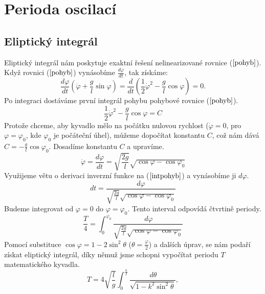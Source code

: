 \section{Perioda oscilací}
\label{sec:Perioda oscilací}

\subsection{Eliptický integrál}
\label{sec:Eliptický integrál}
Eliptický integrál nám poskytuje exaktní řešení nelinearizované rovnice ($\ref{pohyb}$). Když rovnici ($\ref{pohyb}$) vynásobíme $\frac{d\varphi}{dt}$, tak získáme:
\begin{equation*}
\frac{d\varphi}{dt}\left(\ddot{\varphi}+\frac{g}{l}\sin\varphi\right)=\frac{d}{dt}\left(\frac{1}{2}\dot{\varphi}^2-\frac{g}{l}\cos\varphi\right)=0.
\end{equation*}
Po integraci dostáváme první integrál pohybu pohybové rovnice ($\ref{pohyb}$).
\begin{equation}
\frac{1}{2}\dot{\varphi}^2-\frac{g}{l}\cos\varphi=C
\end{equation}
Protože chceme, aby kyvadlo mělo na počátku nulovou rychlost ($\dot{\varphi}=0$, pro $\varphi=\varphi_0$, kde $\varphi_0$ je počáteční úhel), můžeme dopočítat konstantu $C$, což nám dává $C=-\frac{g}{l}\cos\varphi_0$. Dosadíme konstantu $C$ a upravíme.
\begin{equation}
\label{intpohyb}
\dot{\varphi}=\frac{d\varphi}{dt}=\sqrt{\frac{2g}{l}}\sqrt{\cos\varphi-\cos\varphi_0}
\end{equation}
Využijeme větu o derivaci inverzní funkce na ($\ref{intpohyb}$) a vynásobíme ji $d\varphi$.
\begin{equation}
dt=\frac{d\varphi}{\sqrt{\frac{2g}{l}}\sqrt{\cos\varphi-\cos\varphi_0}}
\end{equation}
Budeme integrovat od $\varphi=0$ do $\varphi=\varphi_0$. Tento interval odpovídá čtvrtině periody.
\begin{equation}
\frac{T}{4}=\int_{0}^{\varphi_0}\frac{\,d\varphi}{\sqrt{\frac{2g}{l}}\sqrt{\cos\varphi-\cos\varphi_0}}
\end{equation}
Pomocí substituce $\cos\varphi=1-2\sin^2\theta$ ($\theta=\frac{\varphi}{2}$) a dalších úprav, se nám podaří získat eliptický integrál, díky němuž jsme schopni vypočítat periodu $T$ matematického kyvadla.
\begin{equation}
\label{integ}
T=4\sqrt{\frac{l}{g}}\int_{0}^{\frac{\pi}{2}}\frac{\,d\theta}{\sqrt{1-k^2\sin^2\theta}},
\end{equation}
